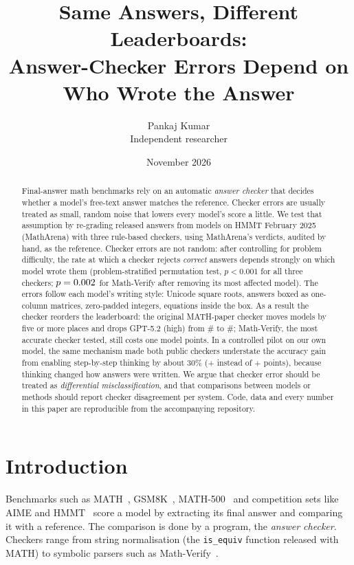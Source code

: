 \documentclass[11pt]{article}
\title{Same Answers, Different Leaderboards:\\Answer-Checker Errors Depend on Who Wrote the Answer}
\author{Pankaj Kumar\\Independent researcher\\\small\repo}
\date{November 2026}
\begin{document}
\maketitle

\begin{abstract}
Final-answer math benchmarks rely on an automatic \emph{answer checker} that decides whether a model's free-text answer matches the reference.
Checker errors are usually treated as small, random noise that lowers every model's score a little.
We test that assumption by re-grading \maAnswers{} released answers from \maModels{} models on HMMT February 2025 (MathArena) with three rule-based checkers, using MathArena's verdicts, audited by hand, as the reference.
Checker errors are not random: after controlling for problem difficulty, the rate at which a checker rejects \emph{correct} answers depends strongly on which model wrote them (problem-stratified permutation test, $p<0.001$ for all three checkers; $p=0.002$ for Math-Verify after removing its most affected model).
The errors follow each model's writing style: Unicode square roots, answers boxed as one-column matrices, zero-padded integers, equations inside the box.
As a result the checker reorders the leaderboard: the original MATH-paper checker moves \hendrycksModelsMovedFive{} models by five or more places and drops GPT-5.2 (high) from \#\gptRefRank{} to \#\gptHenRank{}; Math-Verify, the most accurate checker tested, still costs one model \grokMVDrop{} points.
In a controlled pilot on our own model, the same mechanism made both public checkers understate the accuracy gain from enabling step-by-step thinking by about 30\% (+\pilotGainMathverify{} instead of +\pilotGainOurs{} points), because thinking changed how answers were written.
We argue that checker error should be treated as \emph{differential misclassification}, and that comparisons between models or methods should report checker disagreement per system. Code, data and every number in this paper are reproducible from the accompanying repository.
\end{abstract}

\section{Introduction}

Benchmarks such as MATH~\citep{hendrycks2021math}, GSM8K~\citep{cobbe2021gsm8k}, MATH-500~\citep{lightman2023verify} and competition sets like AIME and HMMT~\citep{balunovic2025matharena} score a model by extracting its final answer and comparing it with a reference.
The comparison is done by a program, the \emph{answer checker}. Checkers range from string normalisation (the \texttt{is\_equiv} function released with MATH) to symbolic parsers such as Math-Verify~\citep{mathverify}.
\end{document}
